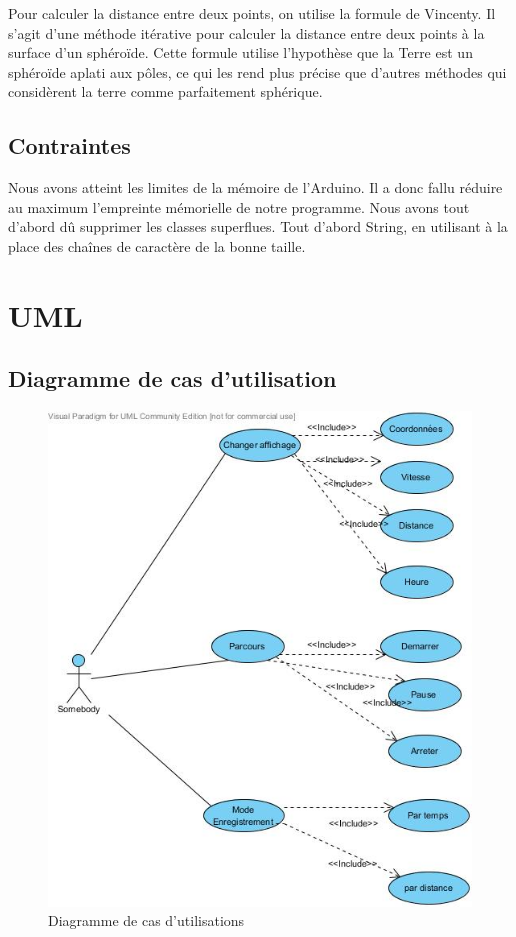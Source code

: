 \documentclass[a4paper,12pt,titlepage]{article}
\begin{document}
Pour calculer la distance entre deux points, on utilise la formule de Vincenty.
Il s'agit d'une méthode itérative pour calculer la distance entre deux points à la surface d'un sphéroïde.
Cette formule utilise l'hypothèse que la Terre est un sphéroïde aplati aux pôles, ce qui les rend plus précise que d’autres méthodes qui considèrent la terre comme parfaitement sphérique.



\subsection{Contraintes}

Nous avons atteint les limites de la mémoire de l'Arduino. Il a donc fallu réduire au maximum l'empreinte mémorielle de notre programme.
Nous avons tout d'abord dû supprimer les classes superflues. Tout d'abord String, en utilisant à la place des chaînes de caractère de la bonne taille.


\section{UML}

\subsection{Diagramme de cas d'utilisation}

\begin{figure}[H]
	\centering
	\includegraphics[width=\textwidth]{use_case.jpg}
	\caption{Diagramme de cas d'utilisations}
	\label{usecase}
\end{figure}
\end{document}
